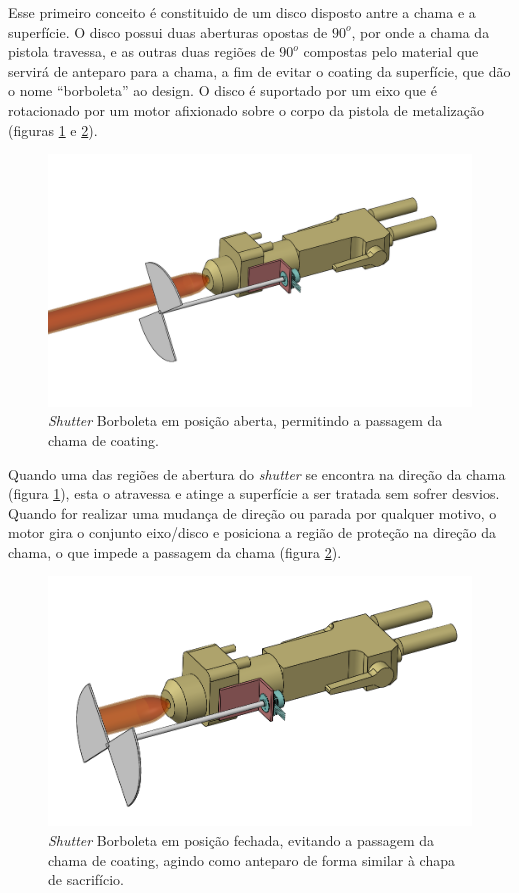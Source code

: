 Esse primeiro conceito é constituido de um disco disposto antre a chama e a
superfície. O disco possui duas aberturas opostas de $90^o$, por onde a chama da
pistola travessa, e as outras duas regiões de $90^o$ compostas pelo material que
servirá de anteparo para a chama, a fim de evitar o coating da superfície, que
dão o nome ``borboleta'' ao design.
O disco é suportado por um eixo que é rotacionado por um motor afixionado sobre o
corpo da pistola de metalização (figuras \ref{fig::borboleta_aberta} e
\ref{fig::borboleta_fechada}).

\begin{figure}[h!]
\centering
	\includegraphics[width=\columnwidth]{figs/estudo/shutter/Shutter_Borboleta_Aberto}
	\caption{\textit{Shutter} Borboleta em posição aberta, permitindo a passagem da chama
	de coating.}
	\label{fig::borboleta_aberta}
\end{figure}

Quando uma das regiões de abertura do \textit{shutter} se encontra na direção da
chama (figura \ref{fig::borboleta_aberta}), esta o atravessa e atinge a
superfície a ser tratada sem sofrer desvios. Quando for realizar uma mudança de
direção ou parada por qualquer motivo, o motor gira o conjunto eixo/disco e
posiciona a região de proteção na direção da chama, o que impede a passagem da
chama (figura \ref{fig::borboleta_fechada}).

\begin{figure}[h!]
\centering
	\includegraphics[width=\columnwidth]{figs/estudo/shutter/Shutter_Borboleta_Fechado}
	\caption{\textit{Shutter} Borboleta em posição fechada, evitando a passagem da chama
	de coating, agindo como anteparo de forma similar à chapa de sacrifício.}
	\label{fig::borboleta_fechada}
\end{figure}

